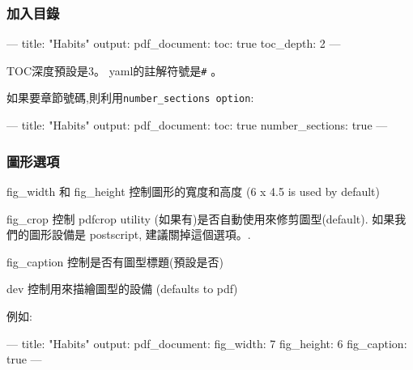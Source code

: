 \documentclass[]{book}
\newenvironment{Shaded}{\begin{snugshade}}{\end{snugshade}}
\newcommand{\AttributeTok}[1]{\textcolor[rgb]{0.77,0.63,0.00}{#1}}
\newcommand{\FunctionTok}[1]{\textcolor[rgb]{0.00,0.00,0.00}{#1}}
\newcommand{\OtherTok}[1]{\textcolor[rgb]{0.56,0.35,0.01}{#1}}
\newcommand{\StringTok}[1]{\textcolor[rgb]{0.31,0.60,0.02}{#1}}
\theoremstyle{definition}
\theoremstyle{definition}
\theoremstyle{definition}
\theoremstyle{remark}
\begin{document}
\subsubsection{加入目錄}

\begin{Shaded}
\begin{Highlighting}[]
\OtherTok{---}
\FunctionTok{title:}\AttributeTok{ }\StringTok{"Habits"}
\FunctionTok{output:}
  \FunctionTok{pdf_document:}
    \FunctionTok{toc:}\AttributeTok{ true}
    \FunctionTok{toc_depth:}\AttributeTok{ 2}
\OtherTok{---}
\end{Highlighting}
\end{Shaded}

TOC深度預設是3。 yaml的註解符號是\texttt{\#} 。

如果要章節號碼,則利用\texttt{number\_sections\ option}:

\begin{Shaded}
\begin{Highlighting}[]
\OtherTok{---}
\FunctionTok{title:}\AttributeTok{ }\StringTok{"Habits"}
\FunctionTok{output:}
  \FunctionTok{pdf_document:}
    \FunctionTok{toc:}\AttributeTok{ true}
    \FunctionTok{number_sections:}\AttributeTok{ true}
\OtherTok{---}
\end{Highlighting}
\end{Shaded}

\subsubsection{圖形選項}

fig\_width 和 fig\_height 控制圖形的寬度和高度 (6 x 4.5 is used by
default)

fig\_crop 控制 pdfcrop utility (如果有)是否自動使用來修剪圖型(default).
如果我們的圖形設備是 postscript, 建議關掉這個選項。.

fig\_caption 控制是否有圖型標題(預設是否)

dev 控制用來描繪圖型的設備 (defaults to pdf)

例如:

\begin{Shaded}
\begin{Highlighting}[]
\OtherTok{---}
\FunctionTok{title:}\AttributeTok{ }\StringTok{"Habits"}
\FunctionTok{output:}
  \FunctionTok{pdf_document:}
    \FunctionTok{fig_width:}\AttributeTok{ 7}
    \FunctionTok{fig_height:}\AttributeTok{ 6}
    \FunctionTok{fig_caption:}\AttributeTok{ true}
\OtherTok{---}
\end{Highlighting}
\end{Shaded}
\end{document}
